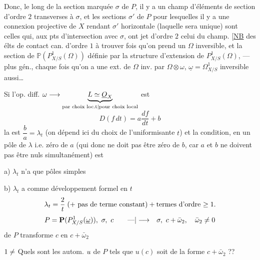 Donc, le long de la section marquée $\sigma$ de $P$, il y a un champ d'éléments de section d'ordre $2$ transverses à $\sigma$, et les sections $\sigma'$ de $P$  pour lesquelles il y a une connexion projective de $X$ rendant $\sigma'$ horizontale (laquelle sera unique) sont celles qui, aux pts d'intersection avec $\sigma$, ont  jet d'ordre $2$ celui du champ. [\uline{NB} des élts de contact can. d'ordre $1$ à trouver  fois qu'on prend un $\Omega$ inversible, et la section de $\mathbb{P}(P^1_{X/S}(\Omega))$ définie par la
structure d'extension de $P^1_{X/S}(\Omega)$, --- plus gén., chaque fois qu'on a une ext. de $\Omega$ inv. par $\Omega\otimes\omega$, $\underline{\omega}=\Omega^1_{X/S}$ inversible aussi\ldots

Si l'op. diff. $\omega\longrightarrow\underbrace{L\simeq\underline{O}_X}_{{\text{par choix loc.t}|\text{pour choix local}}}$ est
\[
D(f\,dt)=a\frac{df}{dt}+b
\]
la  est $\dfrac ba=\lambda_t$
(on dépend ici du choix de l'uniformisante $t$)
et la condition, en un pôle de $\lambda$ i.e. zéro de $a$
(qui donc ne doit pas être zéro de $b$, car $a$ et $b$ ne doivent pas être nuls simultanément) est

\noindent a) $\lambda_t$  n'a que pôles simples

\noindent b) \deleted{$\unsure{\beta}$} $\lambda_t$ a comme développement formel en $t$
\[
\lambda_t=\frac{2}{t}\;(+\text{ pas de terme constant})+\text{termes d'ordre }{\geq1}.
\]
\[
P=\mathbf P(P^1_{X/S}(\underline\omega)),\ \sigma,\ c
\qquad\unsure{\text{---}|\longrightarrow}\quad\sigma,\ c+\bar\omega_2,\quad\bar\omega_2\ne0
\]
 de $P$ transforme $c$ en $c+\bar\omega_2$

 \uline{} ${1\ne}$ 
Quels sont les autom. ${u}$ de $P$ tels que $u(c)$ soit de la forme $c+\bar\omega_2$ ??

\margin{$\unsure{\omega}$}

